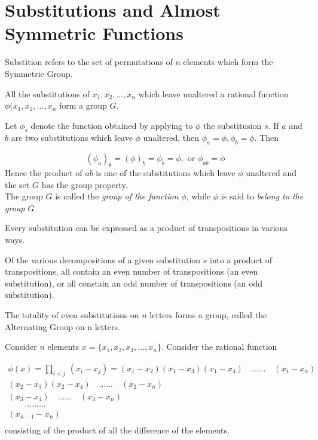 \section{Substitutions and Almost Symmetric Functions}

Substition refers to the set of permutations of $n$ elements which form the Symmetric Group.

\begin{theorem}
All the substitutions of $x_1, x_2, \hdots, x_n$ which leave unaltered a rational function
$\phi(x_1, x_2,\hdots, x_n$ form a group $G$.
\end{theorem}

Let $\phi_s$ denote the function obtained by applying to $\phi$ the substitusion $s$. If $a$ and $b$
are two substitutions which leave $\phi$ unaltered, then $\phi_a = \phi, \phi_b = \phi$. Then

\[ (\phi_a)_b = (\phi)_b = \phi_b = \phi, \mbox{ or } \phi_{ab} = \phi \]
Hence the product of $ab$ is one of the substitutions which leave $\phi$ unaltered and the set
$G$ has the group property. \\

The group $G$ is called the {\it group of the function $\phi$}, while $\phi$ is said to {\it belong to the
group $G$}\\

\begin{theorem}
Every substitution can be expressed as a product of transpositions in various ways.
\end{theorem}

\begin{theorem}
Of the various decompositions of a given substitution $s$ into a product of transpositions, all contain
an even number of transpositions (an even substitution), or all constain an odd number of transpositions
(an odd substitution).
\end{theorem}

\begin{corollary}
The totality of even substitutions on $n$ letters forms a group, called the Alternating Group on n letters.
\end{corollary}


Consider $n$ elements $x=\{ x_1, x_2, x_3, \hdots, x_n \}$. Consider the rational function

$$\displaystyle
\begin{array}{r}
\phi(x) = \prod_{i < j}\, (x_i - x_j) = (x_1-x_2) (x_1-x_3) (x_1-x_4) \quad \hdots\hdots\quad (x_1 - x_n) \\
(x_2-x_3) (x_2-x_4) \quad \hdots\hdots\quad (x_2 - x_n) \\
(x_3-x_4) \quad \hdots\hdots\quad (x_3 - x_n) \\
\quad\quad \hdots\hdots\hdots \quad\quad\quad~~\\
(x_{n-1} - x_n) \\
\end{array}
$$
consisting of the product of all the difference of the elements.\\


